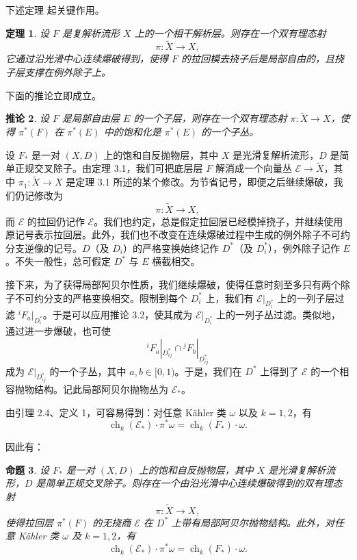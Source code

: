 \documentclass[12pt,a4paper]{article}
\newtheorem{theorem}{定理}[section]
\newtheorem{proposition}[theorem]{命题}
\newtheorem{corollary}[theorem]{推论}
\newcommand{\ch}{\operatorname{ch}}
\begin{document}
下述定理 \cite[Theorem 4.11]{Grivaux} 起关键作用。

\begin{theorem}
设 \(F\) 是复解析流形 \(X\) 上的一个相干解析层。则存在一个双有理态射
\[
\pi:\widetilde X\to X,
\]
它通过沿光滑中心连续爆破得到，使得 \(F\) 的拉回模去挠子后是局部自由的，且挠子层支撑在例外除子上。
\end{theorem}

下面的推论立即成立。

\begin{corollary}
设 \(F\) 是局部自由层 \(E\) 的一个子层，则存在一个双有理态射 \(\pi:\widetilde X\to X\)，使得 \(\pi^*(F)\) 在 \(\pi^*(E)\) 中的饱和化是 \(\pi^*(E)\) 的一个子丛。
\end{corollary}

设 \(F_*\) 是一对 \((X,D)\) 上的饱和自反抛物层，其中 \(X\) 是光滑复解析流形，\(D\) 是简单正规交叉除子。由定理 3.1，我们可把底层层 \(F\) 解消成一个向量丛 \(\mathcal E\to \widetilde X\)，其中 \(\pi_1:\widetilde X\to X\) 是定理 3.1 所述的某个修改。为节省记号，即便之后继续爆破，我们仍记修改为
\[
\pi:\widetilde X\to X,
\]
而 \(\mathcal E\) 的拉回仍记作 \(\mathcal E\)。我们也约定，总是假定拉回层已经模掉挠子，并继续使用原记号表示拉回层。此外，我们也不改变在连续爆破过程中生成的例外除子不可约分支逆像的记号。\(D\)（及 \(D_i\)）的严格变换始终记作 \(D^*\)（及 \(D_i^*\)），例外除子记作 \(E\)。不失一般性，总可假定 \(D^*\) 与 \(E\) 横截相交。

接下来，为了获得局部阿贝尔性质，我们继续爆破，使得任意时刻至多只有两个除子不可约分支的严格变换相交。限制到每个 \(D_i^*\) 上，我们有 \(\mathcal E|_{D_i^*}\) 上的一列子层过滤 \({}^iF_a|_{D_i^*}\)。于是可以应用推论 3.2，使其成为 \(\mathcal E|_{D_i^*}\) 上的一列子丛过滤。类似地，通过进一步爆破，也可使
\[
{}^iF_a|_{D_{ij}^*}\cap {}^jF_b|_{D_{ij}^*}
\]
成为 \(\mathcal E|_{D_{ij}^*}\) 的一个子丛，其中 \(a,b\in[0,1)\)。于是，我们在 \(D^*\) 上得到了 \(\mathcal E\) 的一个相容抛物结构。记此局部阿贝尔抛物丛为 \(\mathcal E_*\)。

由引理 2.4、定义 1，可容易得到：对任意 Kähler 类 \(\omega\) 以及 \(k=1,2\)，有
\[
\ch_k(\mathcal E_*)\cdot \pi^*\omega=\ch_k(F_*)\cdot \omega.
\]

因此有：

\begin{proposition}
设 \(F_*\) 是一对 \((X,D)\) 上的饱和自反抛物层，其中 \(X\) 是光滑复解析流形，\(D\) 是简单正规交叉除子。则存在一个由沿光滑中心连续爆破得到的双有理态射
\[
\pi:\widetilde X\to X,
\]
使得拉回层 \(\pi^*(F)\) 的无挠商 \(\mathcal E\) 在 \(D^*\) 上带有局部阿贝尔抛物结构。此外，对任意 Kähler 类 \(\omega\) 及 \(k=1,2\)，有
\[
\ch_k(\mathcal E_*)\cdot \pi^*\omega=\ch_k(F_*)\cdot \omega.
\]
\end{proposition}
\end{document}
